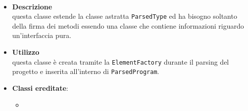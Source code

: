 \paragraph{}
\label{\nogloxy{SWEDesigner::Server::Project::ParsedInterface}}
\begin{itemize}
\item \textbf{Descrizione}\\
questa classe estende la classe astratta \texttt{ParsedType} ed ha bisogno soltanto della firma dei metodi essendo una classe che contiene informazioni riguardo un'interfaccia pura.
\item \textbf{Utilizzo}\\
questa classe è creata tramite la \texttt{ElementFactory} durante il parsing del progetto e inserita all'interno di \texttt{ParsedProgram}.
\item \textbf{Classi ereditate}:
\begin{itemize}
\item \hyperref[\nogloxy{SWEDesigner::Server::Project::ParsedType}]{}
\end{itemize}
\end{itemize}

